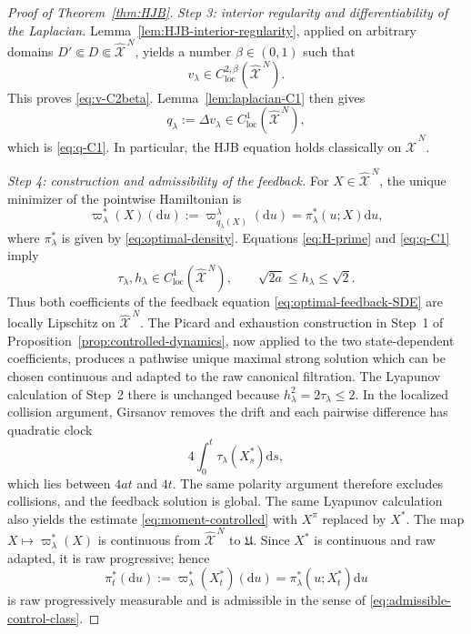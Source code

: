 \documentclass[10pt,a4paper]{amsart}
\def\Xc{{\mathcal X}}
\newcommand{\dd}{\mathrm{d}}
\def\hX{\widehat{\Xc}^{\,N}}
\begin{document}
\begin{proof}[Proof of Theorem~\ref{thm:HJB}]
\medskip
\noindent\textit{Step 3: interior regularity and differentiability of the Laplacian.}
Lemma~\ref{lem:HJB-interior-regularity}, applied on arbitrary domains
$D'\Subset D\Subset\hX$, yields a number $\beta\in(0,1)$ such that
\[
 v_\lambda\in C_{\mathrm{loc}}^{2,\beta}(\hX).
\]
This proves \eqref{eq:v-C2beta}.  Lemma~\ref{lem:laplacian-C1} then gives
\[
 q_\lambda:=\Delta v_\lambda\in C_{\mathrm{loc}}^1(\hX),
\]
which is \eqref{eq:q-C1}.  In particular, the HJB equation holds classically on $\hX$.

\medskip
\noindent\textit{Step 4: construction and admissibility of the feedback.}
For $X\in\hX$, the unique minimizer of the pointwise Hamiltonian is
\[
 \varpi_\lambda^*(X)(\dd u)
 :=\varpi_{q_\lambda(X)}^\lambda(\dd u)
 =\pi_\lambda^*(u;X)\dd u,
\]
where $\pi_\lambda^*$ is given by \eqref{eq:optimal-density}.  Equations
\eqref{eq:H-prime} and \eqref{eq:q-C1} imply
\[
 \tau_\lambda,h_\lambda\in C^1_{\mathrm{loc}}(\hX),
 \qquad
 \sqrt{2a}\le h_\lambda\le\sqrt2.
\]
Thus both coefficients of the feedback equation \eqref{eq:optimal-feedback-SDE} are locally
Lipschitz on $\hX$.  The Picard and exhaustion construction in Step~1 of
Proposition~\ref{prop:controlled-dynamics}, now applied to the two state-dependent coefficients,
produces a pathwise unique maximal strong solution which can be chosen continuous and adapted to
the raw canonical filtration.  The Lyapunov calculation of Step~2 there is unchanged because
$h_\lambda^2=2\tau_\lambda\le2$.  In the localized collision argument, Girsanov removes the drift
and each pairwise difference has quadratic clock
\[
 4\int_0^t\tau_\lambda(X_s^*)\dd s,
\]
which lies between $4at$ and $4t$.  The same polarity argument therefore excludes collisions, and
the feedback solution is global.  The same Lyapunov calculation also yields the estimate
\eqref{eq:moment-controlled} with $X^\pi$ replaced by $X^*$.
The map $X\mapsto\varpi_\lambda^*(X)$ is continuous from $\hX$ to $\mathfrak U$.  Since $X^*$ is
continuous and raw adapted, it is raw progressive; hence
\begin{equation}\label{eq:feedback-control-raw-progressive}
 \pi_t^*(\dd u)
 :=\varpi_\lambda^*(X_t^*)(\dd u)
 =\pi_\lambda^*(u;X_t^*)\dd u
\end{equation}
is raw progressively measurable and is admissible in the sense of
\eqref{eq:admissible-control-class}.


\end{proof}
\end{document}
